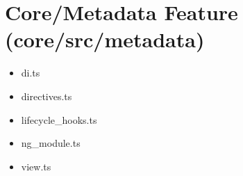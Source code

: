 \section{Core/Metadata Feature (core/src/metadata)}





\begin{itemize}
  \item di.ts
  \item directives.ts
  \item lifecycle\_hooks.ts
  \item ng\_module.ts
  \item view.ts
\end{itemize}









